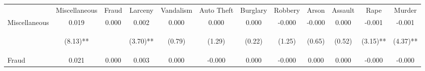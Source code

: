 \begin{tabular}{lccccccccccc}
\hline\hline \noalign{\smallskip} & Miscellaneous & Fraud & Larceny & Vandalism & Auto Theft & Burglary & Robbery & Arson & Assault & Rape & Murder\\
\noalign{\smallskip}\hline \noalign{\smallskip}Miscellaneous & 0.019 & 0.000 & 0.002 & 0.000 & 0.000 & 0.000 & -0.000 & -0.000 & 0.000 & -0.001 & -0.001\\
 & \begin{footnotesize}(8.13)**\end{footnotesize} & \begin{footnotesize}\end{footnotesize} & \begin{footnotesize}(3.70)**\end{footnotesize} & \begin{footnotesize}(0.79)\end{footnotesize} & \begin{footnotesize}(1.29)\end{footnotesize} & \begin{footnotesize}(0.22)\end{footnotesize} & \begin{footnotesize}(1.25)\end{footnotesize} & \begin{footnotesize}(0.65)\end{footnotesize} & \begin{footnotesize}(0.52)\end{footnotesize} & \begin{footnotesize}(3.15)**\end{footnotesize} & \begin{footnotesize}(4.37)**\end{footnotesize}\\
\noalign{\smallskip}Fraud & 0.021 & 0.000 & 0.003 & 0.000 & -0.000 & 0.000 & -0.000 & 0.000 & 0.000 & -0.000 & -0.000\\

\end{tabular}

